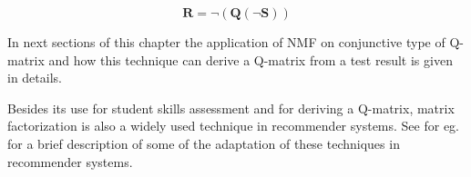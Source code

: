 \begin{equation}
\mathbf{R}=\neg\left(\mathbf{Q}\left(\neg\mathbf{S}\right)\right)\label{eq:6}
\end{equation}

In next sections of this chapter the application of NMF on conjunctive type of Q-matrix and how this technique can derive a Q-matrix from a test result is given in details.

Besides its use for student skills assessment and for deriving a Q-matrix, matrix factorization is also a widely used technique in recommender systems. See for eg. \citet{koren2009matrix}  for a brief description of some of the adaptation of these techniques in recommender systems. 







